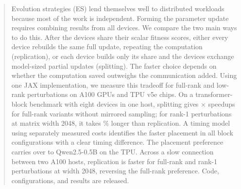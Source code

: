 \begin{abstract}
Evolution strategies (ES) lend themselves well to distributed workloads because most of
the work is independent. Forming the parameter update requires combining results from all devices.
We compare the two main ways to do this. After the devices share their scalar fitness
scores, either every device rebuilds the same full update, repeating the computation
(replication), or each device builds only its share and the devices exchange model-sized
partial updates (splitting). The faster choice depends on
whether the computation saved outweighs the communication added. Using one JAX implementation,
we measure this tradeoff for full-rank and low-rank perturbations on A100 GPUs and TPU v5e
chips. On a transformer-block benchmark with eight devices in one host, splitting gives
\FullRankSpeedup$\times$ speedups for full-rank variants without mirrored sampling; for rank-1
perturbations at matrix width 2048, it takes \LowRankSlowdown\% longer than replication.
A timing model using separately measured costs identifies the faster placement in all
\ModelResolved{} block configurations with a clear timing difference. The placement preference
carries over to Qwen2.5-0.5B on the TPU. Across a slow connection between two A100 hosts,
replication is faster for full-rank and rank-1 perturbations at width 2048, reversing the
full-rank preference. Code, configurations, and results are released.
\end{abstract}
